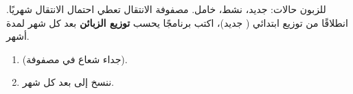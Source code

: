 \begin{statement}
للزبون  حالات:  جديد،  نشط،  خامل. مصفوفة الانتقال  تعطي احتمال الانتقال شهريًا. انطلاقًا من توزيع ابتدائي ( جديد)، اكتب برنامجًا يحسب \textbf{توزيع الزبائن} بعد كل شهر لمدة  أشهر.
\end{statement}
\begin{stepsbox}\begin{enumerate}
\item \par{\centering\small{}\par} (جداء شعاع في مصفوفة).
\item ننسخ  إلى  بعد كل شهر.
\end{enumerate}\end{stepsbox}
